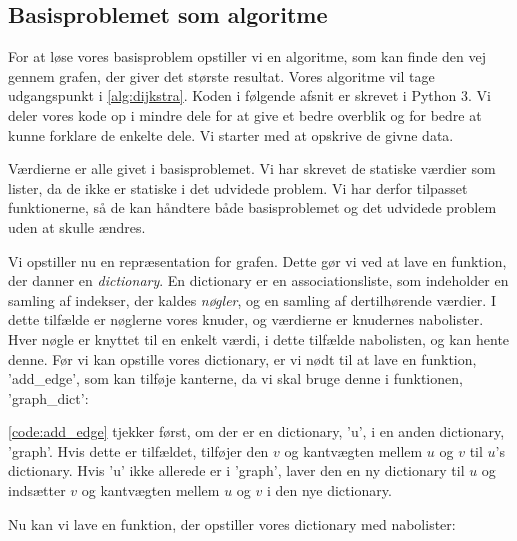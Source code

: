 \subsection{Basisproblemet som algoritme}
For at løse vores basisproblem opstiller vi en algoritme, som kan finde den vej gennem grafen, der giver det største resultat. Vores algoritme vil tage udgangspunkt i \autoref{alg:dijkstra}. Koden i følgende afsnit er skrevet i Python 3. Vi deler vores kode op i mindre dele for at give et bedre overblik og for bedre at kunne forklare de enkelte dele. Vi starter med at opskrive de givne data.



Værdierne er alle givet i basisproblemet. Vi har skrevet de statiske værdier som lister, da de ikke er statiske i det udvidede problem. Vi har derfor tilpasset funktionerne, så de kan håndtere både basisproblemet og det udvidede problem uden at skulle ændres.

Vi opstiller nu en repræsentation for grafen. Dette gør vi ved at lave en funktion, der danner en \emph{dictionary}. En dictionary er en associationsliste, som indeholder en samling af indekser, der kaldes \emph{nøgler}, og en samling af dertilhørende værdier. I dette tilfælde er nøglerne vores knuder, og
værdierne er knudernes nabolister. Hver nøgle er knyttet til en enkelt værdi, i dette tilfælde nabolisten, og kan hente denne. Før vi kan opstille vores dictionary, er vi nødt til at lave en funktion, 'add\_edge', som kan tilføje kanterne, da vi skal bruge denne i funktionen, 'graph\_dict':



\autoref{code:add_edge} tjekker først, om der er en dictionary, 'u', i en anden dictionary, 'graph'. Hvis dette er tilfældet, tilføjer den $v$ og kantvægten mellem $u$ og $v$ til  $u$'s dictionary. Hvis 'u' ikke allerede er i 'graph', laver den en ny dictionary til $u$ og indsætter $v$ og kantvægten mellem $u$ og $v$ i den nye dictionary.

Nu kan vi lave en funktion, der opstiller vores dictionary med nabolister:



